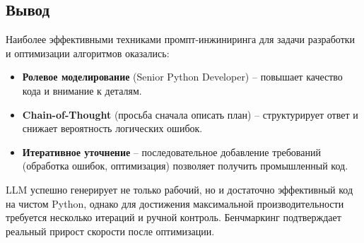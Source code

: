 \subsection{Вывод}
Наиболее эффективными техниками промпт-инжиниринга для задачи разработки и оптимизации алгоритмов оказались:
\begin{itemize}
	\item \textbf{Ролевое моделирование} (Senior Python Developer) – повышает качество кода и внимание к деталям.
	\item \textbf{Chain-of-Thought} (просьба сначала описать план) – структурирует ответ и снижает вероятность логических ошибок.
	\item \textbf{Итеративное уточнение} – последовательное добавление требований (обработка ошибок, оптимизация) позволяет получить промышленный код.
\end{itemize}
LLM успешно генерирует не только рабочий, но и достаточно эффективный код на чистом Python, 
однако для достижения максимальной производительности требуется несколько итераций и ручной контроль. 
Бенчмаркинг подтверждает реальный прирост скорости после оптимизации.